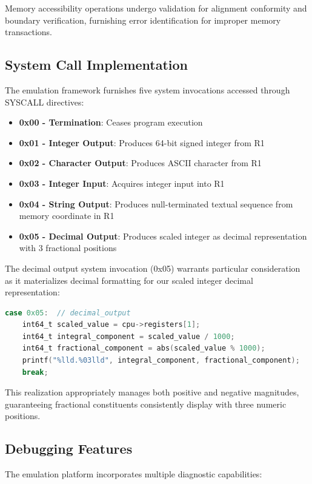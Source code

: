 \documentclass[conference,10pt,twocolumn]{IEEEtran}
\begin{document}
Memory accessibility operations undergo validation for alignment conformity and boundary verification, furnishing error identification for improper memory transactions.

\subsection{System Call Implementation}

The emulation framework furnishes five system invocations accessed through SYSCALL directives:

\begin{itemize}
\item \textbf{0x00 - Termination}: Ceases program execution
\item \textbf{0x01 - Integer Output}: Produces 64-bit signed integer from R1
\item \textbf{0x02 - Character Output}: Produces ASCII character from R1
\item \textbf{0x03 - Integer Input}: Acquires integer input into R1
\item \textbf{0x04 - String Output}: Produces null-terminated textual sequence from memory coordinate in R1
\item \textbf{0x05 - Decimal Output}: Produces scaled integer as decimal representation with 3 fractional positions
\end{itemize}

The decimal output system invocation (0x05) warrants particular consideration as it materializes decimal formatting for our scaled integer decimal representation:

\begin{lstlisting}[language=C, basicstyle=\small\ttfamily]
case 0x05:  // decimal_output
    int64_t scaled_value = cpu->registers[1];
    int64_t integral_component = scaled_value / 1000;
    int64_t fractional_component = abs(scaled_value % 1000);
    printf("%lld.%03lld", integral_component, fractional_component);
    break;
\end{lstlisting}

This realization appropriately manages both positive and negative magnitudes, guaranteeing fractional constituents consistently display with three numeric positions.

\subsection{Debugging Features}

The emulation platform incorporates multiple diagnostic capabilities:
\end{document}

